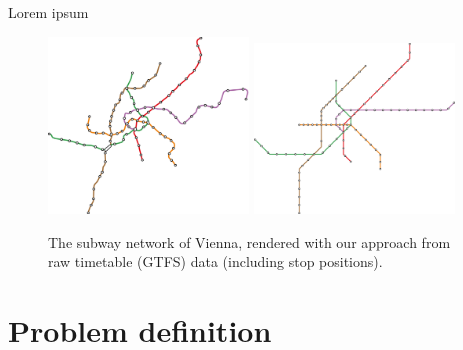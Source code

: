 \documentclass{sig-alternate-sigmod09}
\begin{document}
Lorem ipsum
\begin{figure}[t]
  \centering
	\includegraphics[width=0.474\textwidth]{figures/octi_input.pdf}
	\includegraphics[width=0.474\textwidth]{figures/octi.pdf}
	\caption{The subway network of Vienna, rendered with our approach from raw timetable (GTFS) data (including stop positions).}
	\label{FIG:examplewien}
\end{figure}

\section{Problem definition}
\end{document}
